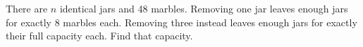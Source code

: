 There are $n$ identical jars and 48 marbles. Removing one jar leaves enough jars for exactly 8 marbles each. Removing three instead leaves enough jars for exactly their full capacity each. Find that capacity.
